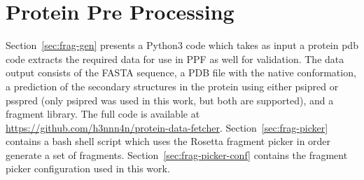 \chapter{Protein Pre Processing}\label{appendix:data-source}

Section~\ref{sec:frag-gen} presents a Python3 code which takes as input a
protein pdb code extracts the required data for use in PPF as well for
validation. The data output consists of the FASTA sequence, a PDB file with the
native conformation, a prediction of the secondary structures in the protein using
either psipred or psspred (only psipred was used in this work, but both are
supported), and a fragment library. The full code is available at
\url{https://github.com/h3nnn4n/protein-data-fetcher}.
Section~\ref{sec:frag-picker} contains a bash shell script which uses the
Rosetta fragment picker in order generate a set of fragments.
Section~\ref{sec:frag-picker-conf} contains the fragment picker configuration
used in this work.

